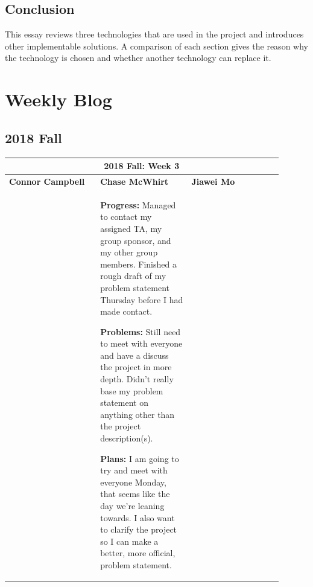 \documentclass[10pt,journal,compsoc, draftclsnofoot,onecolumn]{IEEEtran}
\begin{document}
\subsection{Conclusion}
This essay reviews three technologies that are used in the project and introduces other implementable solutions. A comparison of each section gives the reason why the technology is chosen and whether another technology can replace it. 


\newpage
\section{Weekly Blog}

\subsection{2018 Fall}
\begin{center}
\begin{tabular}{|p{0.3\linewidth}|p{0.3\linewidth}|p{0.3\linewidth}|}
\hline
\multicolumn{3}{|c|}{\textbf{2018 Fall: Week 3}} \\
\hline
\textbf{Connor Campbell} & \textbf{Chase McWhirt} & \textbf{Jiawei Mo} \\ [0.5ex]
\hline\hline


&
\textbf{Progress:} Managed to contact my assigned TA, my group sponsor, and my other group members.
Finished a rough draft of my problem statement Thursday before I had made contact.

\textbf{Problems:} Still need to meet with everyone and have a discuss the project in more depth.
Didn't really base my problem statement on anything other than the project description(s).

\textbf{Plans:} I am going to try and meet with everyone Monday, that seems like the day we're leaning towards.
I also want to clarify the project so I can make a better, more official, problem statement.
&

\\ \hline
\end{tabular}
\end{center}
\end{document}
